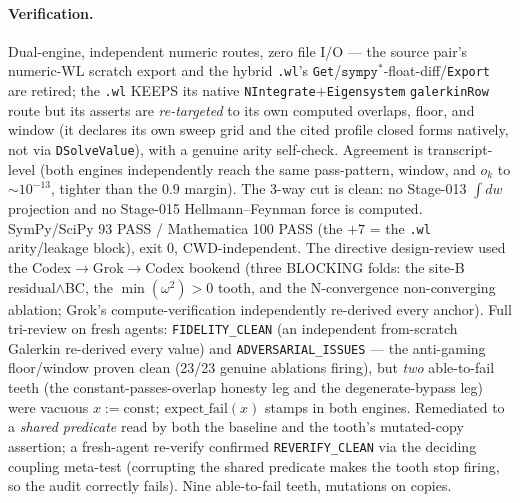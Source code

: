 \paragraph{Verification.}
Dual-engine, independent numeric routes, zero file I/O --- the source pair's
numeric-WL scratch export and the hybrid \texttt{.wl}'s
\texttt{Get}/\(\texttt{sympy}^\ast\)-float-diff/\texttt{Export} are retired; the
\texttt{.wl} KEEPS its native \texttt{NIntegrate}\(+\)\texttt{Eigensystem}
\texttt{galerkinRow} route but its asserts are \emph{re-targeted} to its own
computed overlaps, floor, and window (it declares its own sweep grid and the cited
profile closed forms natively, not via \texttt{DSolveValue}), with a genuine arity
self-check. Agreement is transcript-level (both engines independently reach the
same pass-pattern, window, and \(o_k\) to \(\sim10^{-13}\), tighter than the
\(0.9\) margin). The 3-way cut is clean: no Stage-013 \(\int dw\) projection and no
Stage-015 Hellmann--Feynman force is computed. SymPy/SciPy 93 PASS /
Mathematica 100 PASS (the \(+7\) = the \texttt{.wl} arity/leakage block), exit 0,
CWD-independent. The directive design-review used the Codex\(\to\)Grok\(\to\)Codex
bookend (three BLOCKING folds: the site-B residual\(\wedge\)BC, the
\(\min(\omega^2)>0\) tooth, and the N-convergence non-converging ablation; Grok's
compute-verification independently re-derived every anchor). Full tri-review on
fresh agents: \texttt{FIDELITY\_CLEAN} (an independent from-scratch Galerkin
re-derived every value) and \texttt{ADVERSARIAL\_ISSUES} --- the anti-gaming
floor/window proven clean (23/23 genuine ablations firing), but \emph{two}
able-to-fail teeth (the constant-passes-overlap honesty leg and the
degenerate-bypass leg) were vacuous \(x{:=}\mathrm{const};\ \mathrm{expect\_fail}(x)\)
stamps in both engines. Remediated to a \emph{shared predicate} read by both the
baseline and the tooth's mutated-copy assertion; a fresh-agent re-verify confirmed
\texttt{REVERIFY\_CLEAN} via the deciding coupling meta-test (corrupting the shared
predicate makes the tooth stop firing, so the audit correctly fails). Nine
able-to-fail teeth, mutations on copies.
